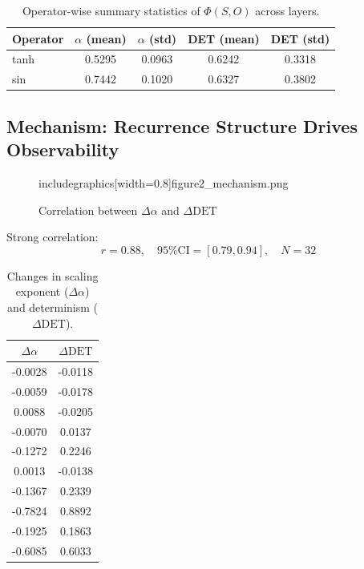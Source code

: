 \documentclass[11pt]{article}
\begin{document}
\begin{table}[h]
	\centering
	\caption{Operator-wise summary statistics of $\Phi(S,O)$ across layers.}
	\begin{tabular}{l c c c c}
		\toprule
		Operator & $\alpha$ (mean) & $\alpha$ (std) & DET (mean) & DET (std) \\
		\midrule
		tanh     & 0.5295          & 0.0963         & 0.6242     & 0.3318    \\
		sin      & 0.7442          & 0.1020         & 0.6327     & 0.3802    \\
		\bottomrule
	\end{tabular}
	\label{tab:operator_summary}
\end{table}

\subsection{Mechanism: Recurrence Structure Drives Observability}

\begin{figure}[h]
	\centering
	includegraphics[width=0.8\linewidth]{figure2_mechanism.png}
	\caption{Correlation between $\Delta \alpha$ and $\Delta \mathrm{DET}$}
\end{figure}

Strong correlation:
\[
	r = 0.88,\quad 95\% \mathrm{CI} = [0.79, 0.94],\quad N = 32
\]

\begin{table}[h]
	\centering
	\caption{Changes in scaling exponent ($\Delta \alpha$) and determinism ($\Delta \mathrm{DET}$).}
	\begin{tabular}{c c}
		\toprule
		$\Delta \alpha$ & $\Delta \mathrm{DET}$ \\
		\midrule
		-0.0028         & -0.0118               \\
		-0.0059         & -0.0178               \\
		0.0088          & -0.0205               \\
		-0.0070         & 0.0137                \\
		-0.1272         & 0.2246                \\
		0.0013          & -0.0138               \\
		-0.1367         & 0.2339                \\
		-0.7824         & 0.8892                \\
		-0.1925         & 0.1863                \\
		-0.6085         & 0.6033                \\
		\bottomrule
	\end{tabular}
	\label{tab:mechanism}
\end{table}
\end{document}
